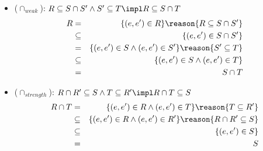 \begin{itemize}
\item ($\cap_{weak}$): $R \subseteq S \cap S' \land S' \subseteq T \impl R \subseteq S \cap T$
\begin{eqnarray*}
R &=& \{(e,e') \in R\} \reason{R \subseteq S \cap S'} \\
&\subseteq & \{(e,e') \in S \cap S'\} \\
&=& \{(e,e') \in S \land (e,e') \in S'\} \reason{S' \subseteq T} \\
&\subseteq & \{(e,e') \in S \land (e,e') \in T\}  \\
&=& S \cap T
\end{eqnarray*}
\item ($\cap_{strength}$): $R \cap R' \subseteq S \land T \subseteq R' \impl R \cap T \subseteq S$
\begin{eqnarray*}
R \cap T &=& \{(e,e') \in R \land (e,e') \in T\} \reason{T \subseteq R'} \\
&\subseteq & \{(e,e') \in R \land (e,e') \in R'\} \reason{R \cap R' \subseteq S} \\
&\subseteq & \{(e,e') \in S\} \\
&=& S
\end{eqnarray*}

\end{itemize}
